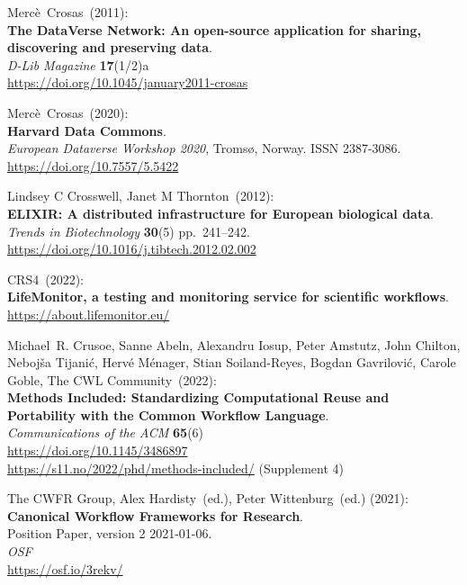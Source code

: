\begin{thebibliography}{9}
Mercè~Crosas~(2011):\\
\textbf{The DataVerse Network: An open-source application for sharing,
discovering and preserving data}.\\
\emph{D-Lib Magazine} \textbf{17}(1/2)a\\
\url{https://doi.org/10.1045/january2011-crosas}

Mercè~Crosas~(2020):\\
\textbf{Harvard Data Commons}.\\
\emph{European Dataverse Workshop 2020}, Tromsø, Norway. ISSN
2387-3086.\\
\url{https://doi.org/10.7557/5.5422}

Lindsey C Crosswell, Janet M Thornton~(2012):\\
\textbf{ELIXIR: A distributed infrastructure for European biological
data}.\\
\emph{Trends in Biotechnology} \textbf{30}(5) pp.~241--242.\\
\url{https://doi.org/10.1016/j.tibtech.2012.02.002}

CRS4~(2022):\\
\textbf{LifeMonitor, a testing and monitoring service for scientific
workflows}.\\
\url{https://about.lifemonitor.eu/}

Michael~R. Crusoe, Sanne Abeln, Alexandru Iosup, Peter
Amstutz, John Chilton, Nebojša Tijanić, Hervé Ménager, Stian
Soiland-Reyes, Bogdan Gavrilović, Carole Goble, The CWL Community~(2022):\\
\textbf{Methods Included: Standardizing
Computational Reuse and Portability with the Common Workflow
Language}.\\
\emph{Communications of the ACM} \textbf{65}(6)\\
\url{https://doi.org/10.1145/3486897} \\
\url{https://s11.no/2022/phd/methods-included/} (Supplement 4)

The CWFR Group, Alex Hardisty~(ed.), Peter Wittenburg~(ed.) (2021):\\
\textbf{Canonical Workflow Frameworks for Research}.\\
Position Paper, version 2 2021-01-06. \\
\emph{OSF} \\
\url{https://osf.io/3rekv/}


\end{thebibliography}
